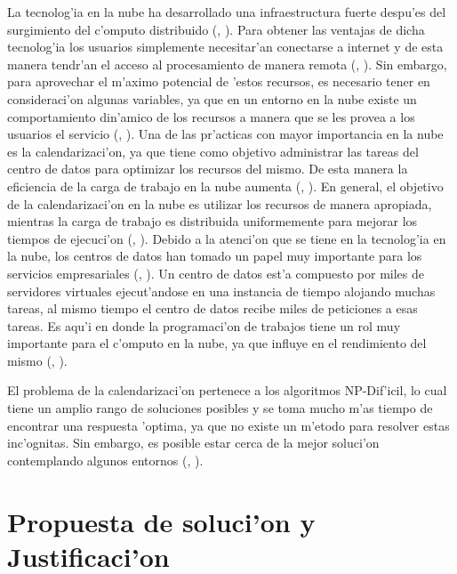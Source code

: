 La tecnolog'ia en la nube ha desarrollado una infraestructura fuerte despu'es del surgimiento del c'omputo distribuido (\citeauthor{chen2009cloud}, \citeyear{chen2009cloud}). Para obtener las ventajas de dicha tecnolog'ia los usuarios simplemente necesitar'an conectarse a internet y de esta manera tendr'an el acceso al procesamiento de manera remota (\citeauthor{aranganathan2011aco}, \citeyear{aranganathan2011aco}). Sin embargo, para aprovechar el m'aximo potencial de 'estos recursos, es necesario tener en consideraci'on algunas variables, ya que en un entorno en la nube existe un comportamiento din'amico de los recursos a manera que se les provea a los usuarios el servicio (\citeauthor{shimpy2014different}, \citeyear{shimpy2014different}).
Una de las pr'acticas con mayor importancia en la nube es la calendarizaci'on, ya que tiene como objetivo administrar las tareas del centro de datos para optimizar los recursos del mismo. De esta manera la eficiencia de la carga de trabajo en la nube aumenta (\citeauthor{shimpy2014different}, \citeyear{shimpy2014different}).
En general, el objetivo de la calendarizaci'on en la nube es utilizar los recursos de manera apropiada, mientras la carga de trabajo es distribuida uniformemente para mejorar los tiempos de ejecuci'on (\citeauthor{shimpy2014different}, \citeyear{shimpy2014different}).
Debido a la atenci'on que se tiene en la tecnolog'ia en la nube, los centros de datos han tomado un papel muy importante para los servicios empresariales (\citeauthor{shimpy2014different}, \citeyear{shimpy2014different}). 
Un centro de datos est'a compuesto por miles de servidores virtuales ejecut'andose en una instancia de tiempo alojando muchas tareas, al mismo tiempo el centro de datos recibe miles de peticiones a esas tareas. Es aqu'i en donde la programaci'on de trabajos tiene un rol muy importante para el c'omputo en la nube, ya que influye en el rendimiento del mismo (\citeauthor{srinivasan2014cloud}, \citeyear{srinivasan2014cloud}). 

El problema de la calendarizaci'on pertenece a los algoritmos NP-Dif'icil, lo cual tiene un amplio rango de soluciones posibles y se toma mucho m'as tiempo de encontrar una respuesta 'optima, ya que no existe un m'etodo para resolver estas inc'ognitas. Sin embargo, es posible estar cerca de la mejor soluci'on contemplando algunos entornos (\citeauthor{shimpy2014different}, \citeyear{shimpy2014different}).




\section*{Propuesta de soluci'on y Justificaci'on}


